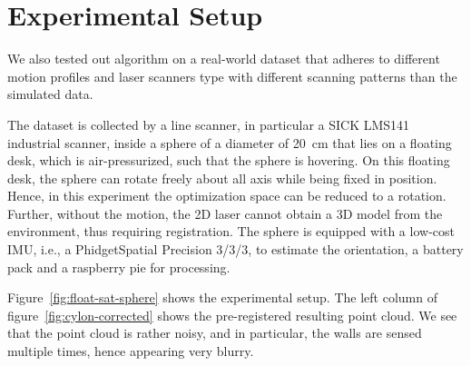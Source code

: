 \section{Experimental Setup}\label{sec:experimentalSetup}

We also tested out algorithm on a real-world dataset that adheres to different motion profiles and laser scanners type with different scanning patterns than the simulated data.  

The dataset is collected by a line scanner, in particular a SICK LMS141 industrial scanner, inside a sphere of a diameter of \SI{20}{\centi\meter} that lies on a floating desk, which is air-pressurized, such that the sphere is hovering.
On this floating desk, the sphere can rotate freely about all axis while being fixed in position. 
Hence, in this experiment the optimization space can be reduced to a rotation.
Further, without the motion, the 2D laser cannot obtain a 3D model from the environment, thus requiring registration. 
The sphere is equipped with a low-cost IMU, i.e., a PhidgetSpatial Precision 3/3/3, to estimate the orientation, a battery pack and a raspberry pie for processing. 

Figure~\ref{fig:float-sat-sphere} shows the experimental setup. The left column of figure~\ref{fig:cylon-corrected} shows the pre-registered resulting point cloud. 
We see that the point cloud is rather noisy, and in particular, the walls are sensed multiple times, hence appearing very blurry. 

